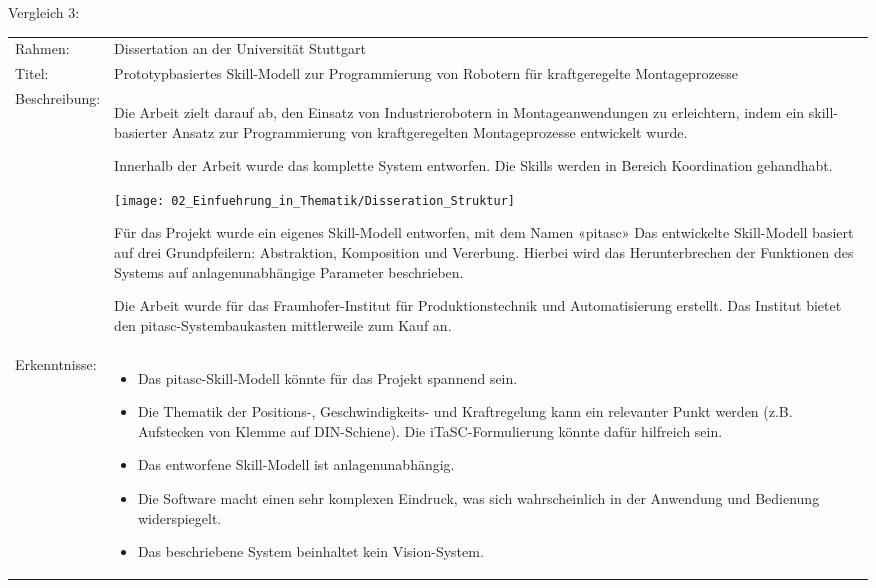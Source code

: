 	\newpage
	
	Vergleich 3:
	\vspace{2mm}
	\\
	\begin{tabularx}{\textwidth}{@{}>{}p{8em} X@{}}
		Rahmen: & 
		Dissertation an der Universität Stuttgart 
		\\
		
		Titel: & 
		Prototypbasiertes Skill-Modell zur Programmierung von Robotern für kraftgeregelte Montageprozesse \cite{Vergleich_3} 
		\\
		
		Beschreibung: & 
		Die Arbeit zielt darauf ab, den Einsatz von Industrierobotern in Montageanwendungen zu erleichtern, indem ein skill-basierter Ansatz zur Programmierung von kraftgeregelten Montageprozesse entwickelt wurde. 
		
		Innerhalb der Arbeit wurde das komplette System entworfen. Die Skills werden in Bereich Koordination gehandhabt.  
		
		\texttt{[image: 02\_Einfuehrung\_in\_Thematik/Disseration\_Struktur]}
		
		Für das Projekt wurde ein eigenes Skill-Modell entworfen, mit dem Namen «pitasc»
		Das entwickelte Skill-Modell basiert auf drei Grundpfeilern: Abstraktion, Komposition und Vererbung. Hierbei wird das Herunterbrechen der Funktionen des Systems auf anlagenunabhängige Parameter beschrieben. 
		
		Die Arbeit wurde für das Fraunhofer-Institut für Produktionstechnik und Automatisierung erstellt. Das Institut bietet den pitasc-Systembaukasten mittlerweile zum Kauf an. 
		\\
		
		Erkenntnisse: & 
		\begin{itemize}
			\item Das pitasc-Skill-Modell könnte für das Projekt spannend sein.
			\item Die Thematik der Positions-, Geschwindigkeits- und Kraftregelung kann ein relevanter Punkt werden (z.B. Aufstecken von Klemme auf DIN-Schiene). Die iTaSC-Formulierung könnte dafür hilfreich sein. 
			\item Das entworfene Skill-Modell ist anlagenunabhängig. 
			\item Die Software macht einen sehr komplexen Eindruck, was sich wahrscheinlich in der Anwendung und Bedienung widerspiegelt.
			\item Das beschriebene System beinhaltet kein Vision-System.
		\end{itemize}
	\end{tabularx}
	
